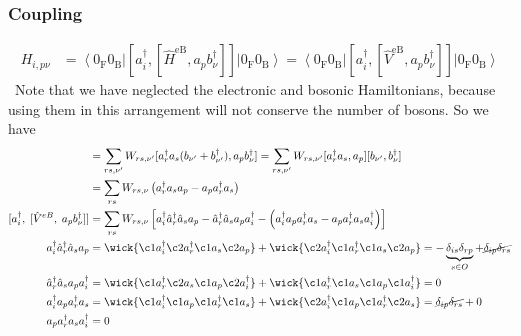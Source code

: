 \subsubsection{Coupling}
\begin{align}
H_{i,p\nu} &= \left\langle 0_{\mathrm{F}} 0_{\mathrm{B}}\right|\left[a_i^\dag, \left[\hat{H}^{\mathrm{eB}}, a_p b_\nu^{\dagger} \right]\right]\left|0_{\mathrm{F}} 0_{\mathrm{B}}\right\rangle = \left\langle 0_{\mathrm{F}} 0_{\mathrm{B}}\right|\left[a_i^\dag, \left[\hat{V}^{\mathrm{eB}}, a_p b_\nu^{\dagger} \right]\right]\left|0_{\mathrm{F}} 0_{\mathrm{B}}\right\rangle
\end{align}\
Note that we have neglected the electronic and bosonic Hamiltonians, because using them in this arrangement will not conserve the number of bosons. So we have
\begin{align}
[ V^{eB},\; a_p b_\nu^\dagger ] &= \sum_{rs,\nu'} W_{rs, \nu'} [ a_r^{\dagger} a_s ( b_{\nu'} + b_{\nu'}^{\dagger} ), a_p b_\nu^\dagger ] = \sum_{rs,\nu'} W_{rs, \nu'} [ a_r^{\dagger} a_s, a_p ][ b_{\nu'}, b_\nu^\dagger ] \\
&= \sum_{rs} W_{rs, \nu} \left( a_r^{\dagger} a_s a_p -  a_p a_r^{\dagger} a_s \right) \\
[a_i^\dagger,\;[\hat V^{eB},\;a_p b_\nu^\dagger]] &= \sum_{rs} W_{rs, \nu} \left[ a_i^\dagger \hat{a}_r^{\dagger} \hat{a}_s a_p  - \hat{a}_r^{\dagger} \hat{a}_s a_p a_i^\dagger  - \left( a_i^\dag a_p a_r^{\dagger}a_s   - a_p a_r^{\dagger}a_s a_i^\dagger \right) \right] \\
a_i^\dagger \hat{a}_r^{\dagger} \hat{a}_s a_p  &= \wick{\c1 a_i^\dagger \c2 a_r^{\dagger} \c1 a_s \c2 a_p} + \wick{\c2 a_i^\dagger \c1 a_r^{\dagger} \c1 a_s \c2 a_p} = -\underbrace{\delta_{is} \delta_{rp}}_{s \in O} + \cancel{\delta_{ip} \delta_{rs}} \\
\hat{a}_r^{\dagger} \hat{a}_s a_p a_i^\dagger &= \wick{\c1 a_r^{\dagger} \c2 a_s \c1 a_p \c2 a_i^\dagger} + \wick{\c1 a_r^{\dagger} \c1 a_s \c1 a_p \c1 a_i^\dagger} = 0 \\
a_i^\dag a_p a_r^{\dagger}a_s &= \wick{\c1 a_i^\dag \c1 a_p \c1 a_r^{\dagger} \c1 a_s} + \wick{\c2 a_i^\dag \c1 a_p \c1 a_r^{\dagger} \c2 a_s} = \cancel{\delta_{ip} \delta_{rs}} + 0 \\
a_p a_r^{\dagger}a_s a_i^\dagger &= 0 \\

\end{align}
